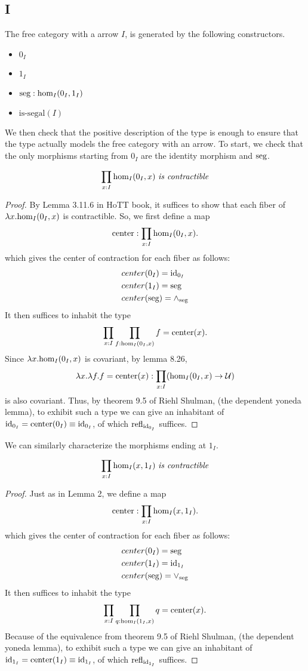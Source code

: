 \documentclass[main.tex]{subfiles}
\begin{document}
\subsection{I}
The free category with a arrow $I$, is generated by the following constructors.
\begin{itemize}
    \item $0_I$
    \item $1_I$
    \item $\seg : \ho[I]{0_I}{1_I}$
    \item $\text{is-segal}(I)$
\end{itemize}
We then check that the positive description of the type is enough to ensure that the type actually models the free category with an arrow. To start, we check that the only morphisms starting from $0_I$ are the identity morphism and $\seg$.
\begin{lemma}
\[
\prod_{x:I}\ho[I]{0_I}{x}\text{ \emph{is contractible}}
\]
\end{lemma}
\begin{proof}
    By Lemma 3.11.6 in HoTT book, it suffices to show that each fiber of $\lambda x. \ho[I]{0_I}{x}$ is contractible. So, we first define a map $$\text{center} : \displaystyle \prod_{x:I}\ho[I]{0_I}{x}.$$
    which gives the center of contraction for each fiber as follows:
    \begin{align*}
        &center(0_I) = \id{0_I}\\
        &center(1_I) = \seg\\
        &center(\seg) = \land_\seg
    \end{align*}
    It then suffices to inhabit the type
    $$\prod_{x:I}\prod_{f:\ho[I]{0_I}{x}}f=\text{center}(x).$$
    Since $\lambda x.\ho[I]{0_I}{x}$ is covariant, by lemma 8.26, $$\lambda x. \lambda f.f = \text{center}(x):\displaystyle \prod_{x:I}(\ho[I]{0_I}{x} \to \mathcal{U})$$
    is also covariant. Thus, by  theorem 9.5 of Riehl Shulman, (the dependent yoneda lemma), to exhibit such a type we can give an inhabitant of $\id{0_I}=\text{center}(0_I) \equiv \id{0_I}$, of which $\refl{\id{0_I}}$ suffices.
\end{proof}
We can similarly characterize the morphisms ending at $1_I$. 
\begin{lemma}
\[
\prod_{x:I}\ho[I]{x}{1_I}\text{ \emph{is contractible}}
\]
\end{lemma}
\begin{proof}
    Just as in Lemma 2, we define a map $$\text{center} : \displaystyle \prod_{x:I}\ho[I]{x}{1_I}.$$
    which gives the center of contraction for each fiber as follows:
    \begin{align*}
        &center(0_I) = \seg\\
        &center(1_I) = \id{1_I}\\
        &center(\seg) = \lor_\seg
    \end{align*}
    It then suffices to inhabit the type
    $$\prod_{x:I}\prod_{q:\ho[I]{1_I}{x}}q=\text{center}(x).$$
    Because of the equivalence from theorem 9.5 of Riehl Shulman, (the dependent yoneda lemma), to exhibit such a type we can give an inhabitant of $\id{1_I}=\text{center}(1_I) \equiv \id{1_I}$, of which $\refl{\id{1_I}}$ suffices.
\end{proof}
\end{document}
